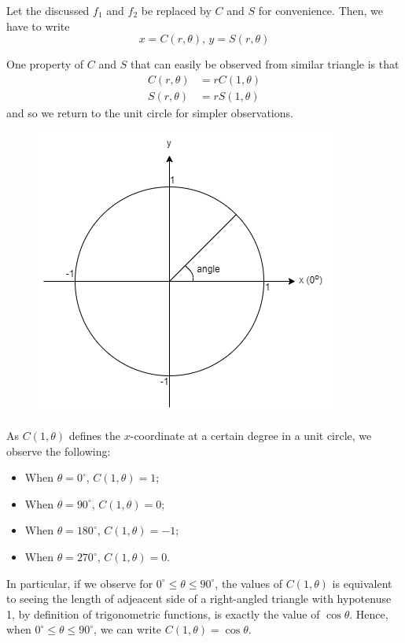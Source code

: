\documentclass[12pt]{article}
\begin{document}
    Let the discussed $f_1$ and $f_2$ be replaced by $C$ and $S$ for convenience. Then, we have to write \[x=C(r,\theta), \, y=S(r,\theta)\]

    One property of $C$ and $S$ that can easily be observed from similar triangle is that \begin{align*}
        C(r,\theta)&=rC(1,\theta)\\
        S(r,\theta)&=rS(1,\theta)
    \end{align*}
    and so we return to the unit circle for simpler observations.

    \begin{figure}[H]
        \centering
        \includegraphics[scale=0.8]{rectpolar.png}
    \end{figure}

    As $C(1,\theta)$ defines the $x$-coordinate at a certain degree in a unit circle, we observe the following:\begin{itemize}
        \item When $\theta=0^\circ$, $C(1,\theta)=1$;
        \item When $\theta=90^\circ$, $C(1,\theta)=0$;
        \item When $\theta=180^\circ$, $C(1,\theta)=-1$;
        \item When $\theta=270^\circ$, $C(1,\theta)=0$.
    \end{itemize}

    In particular, if we observe for $0^\circ \leq \theta \leq 90^\circ$, the values of $C(1,\theta)$ is equivalent to seeing the length of adjeacent side of a right-angled triangle with hypotenuse 1, by definition of trigonometric functions, is exactly the value of $\cos{\theta}$. Hence, when $0^\circ\leq \theta\leq 90^\circ$, we can write $C(1,\theta)=\cos{\theta}$.
\end{document}
